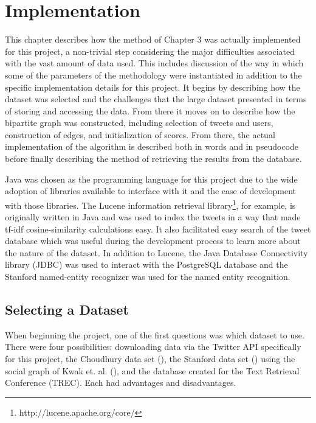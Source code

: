

\chapter{Implementation}

This chapter describes how the method of Chapter 3 was actually implemented for this project, a non-trivial step considering the major difficulties associated with the vast amount of data used. This includes discussion of the way in which some of the parameters of the methodology were instantiated in addition to the specific implementation details for this project. It begins by describing how the dataset was selected and the challenges that the large dataset presented in terms of storing and accessing the data. From there it moves on to describe how the bipartite graph was constructed, including selection of tweets and users, construction of edges,  and initialization of scores. From there, the actual implementation of the algorithm is described both in words and in pseudocode before finally describing the method of retrieving the results from the database.

Java was chosen as the programming language for this project due to the wide adoption of libraries available to interface with it and the ease of development with those libraries. The Lucene information retrieval library\footnote{http://lucene.apache.org/core/}, for example, is originally written in Java and was used to index the tweets in a way that made tf-idf cosine-similarity calculations easy. It also facilitated easy search of the tweet database which was useful during the development process to learn more about the nature of the dataset. In addition to Lucene, the Java Database Connectivity library (JDBC) was used to interact with the PostgreSQL database and the Stanford named-entity recognizer was used for the named entity recognition.

\section{Selecting a Dataset}
\label{sec:SelectingADataset}

When beginning the project, one of the first questions was which dataset to use. There were four possibilities: downloading data via the Twitter API specifically for this project, the Choudhury data set (\cite{Choudhury2010}), the Stanford data set (\cite{Yang2011}) using the social graph of Kwak et. al. (\cite{Kwak2010}), and the database created for the Text Retrieval Conference (TREC). Each had advantages and disadvantages.

